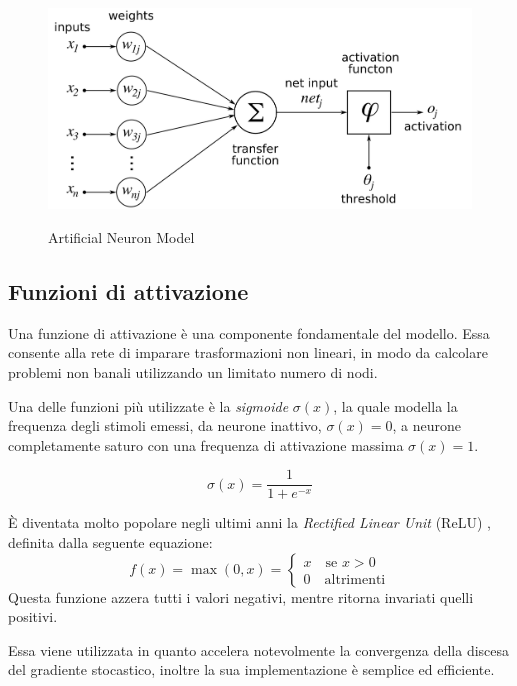 \begin{figure}[htb]
	\centering
	{\includegraphics[width=.7\textwidth]{images/ArtificialNeuronModel}} 
	\caption{Artificial Neuron Model}
	\label{fig:Modello matematico di un neurone artificiale}
\end{figure}

\subsection{Funzioni di attivazione}
\label{subsec:fattivazione}
Una funzione di attivazione è una componente fondamentale del modello. Essa consente alla rete di imparare trasformazioni non lineari, in modo da calcolare problemi non banali utilizzando un limitato numero di nodi.

Una delle funzioni più utilizzate è la \emph{sigmoide} $\sigma(x)$, la quale modella la frequenza degli stimoli emessi, da neurone inattivo, $\sigma(x)=0$, a neurone completamente saturo con una frequenza di attivazione massima $\sigma(x)=1$.

\begin{equation}
\sigma(x) = \frac{1}{1+e^{-x}}
\label{eq:sigmoid}
\end{equation}


È diventata molto popolare negli ultimi anni la \emph{Rectified Linear Unit} (ReLU) \cite{nair2010rectified,hahnloser2000digital,hahnloser2003permitted,glorot2011deepsparse}, definita dalla seguente equazione:
\begin{equation}
f (x) = \max(0, x)= \begin{cases}
x \quad \mbox{se } x>0\\
0 \quad \mbox{altrimenti}
\end{cases}
\label{eq:relu}
\end{equation}
Questa funzione azzera tutti i valori negativi, mentre ritorna invariati quelli positivi.

Essa viene utilizzata in quanto accelera notevolmente la convergenza della discesa del gradiente stocastico, inoltre la sua implementazione è semplice ed efficiente.

